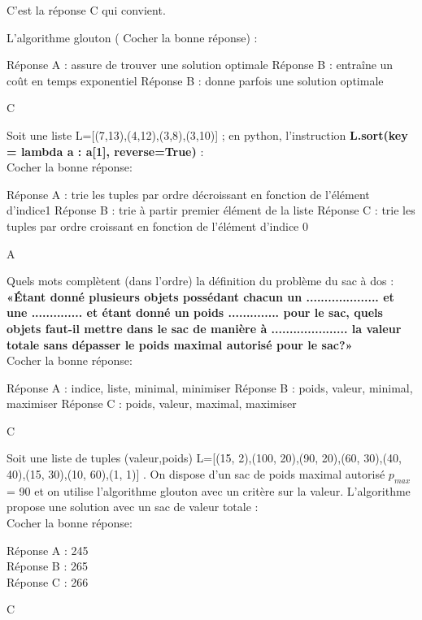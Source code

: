 \documentclass[a4paper,12,answers
]{exam}
\begin{document}
\begin{questions}
\begin{solution}
	C'est la réponse C qui  convient.
	
\end{solution}
\medskip


\question L'algorithme glouton ( Cocher la bonne réponse) :

\begin{checkboxes}
\choice Réponse A :  assure de trouver une solution optimale
\choice Réponse B : entraîne un coût en temps exponentiel
\choice Réponse B : donne parfois une solution optimale
\end{checkboxes}
\begin{solution}
	C
\end{solution}
\medskip
\question Soit une liste L=[(7,13),(4,12),(3,8),(3,10)] ; en python, l'instruction \textbf{L.sort(key = lambda a : a[1], reverse=True) }:\\
Cocher la bonne réponse:
\begin{checkboxes}
\choice Réponse A :  trie  les tuples par ordre décroissant en fonction de l'élément d'indice1
\choice Réponse B :  trie à partir premier élément de la liste
\choice Réponse C :  trie  les tuples par ordre croissant en fonction de l'élément d'indice 0
\end{checkboxes}
\begin{solution}
	A
\end{solution}
\medskip
\question Quels mots complètent (dans l'ordre) la définition du problème du sac à dos : \\
\medskip
\textbf{«Étant  donné  plusieurs  objets  possédant chacun  un  ....................  et  une ..............  et  étant  donné  un  poids ..............  pour  le  sac,  quels  objets faut-il  mettre  dans  le  sac  de  manière  à  .....................  la  valeur  totale  sans  dépasser  le  poids maximal autorisé pour le sac?»}\\
\medskip
Cocher la bonne réponse:

\begin{checkboxes}
	\choice Réponse A : indice, liste, minimal, minimiser
\choice Réponse B :  poids, valeur, minimal, maximiser
\choice Réponse C :  poids, valeur, maximal, maximiser
\end{checkboxes}
\begin{solution}
	C
\end{solution}
\medskip
\question Soit une liste de tuples (valeur,poids) L=[(15, 2),(100, 20),(90, 20),(60, 30),(40, 40),(15, 30),(10, 60),(1, 1)] . On dispose d'un sac de poids maximal autorisé $p_{max}$ = 90 et on utilise l'algorithme glouton avec un critère sur la valeur. L'algorithme propose une solution avec un sac de valeur totale :\\
Cocher la bonne réponse:
\begin{checkboxes}
	\choice Réponse A : 245\\
\choice Réponse B : 265\\
\choice Réponse C : 266
\end{checkboxes}
\begin{solution}
	C
\end{solution}

\end{questions}
\end{document}
